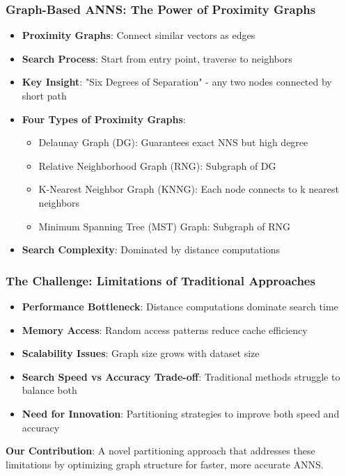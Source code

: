 \begin{frame}
\frametitle{Graph-Based ANNS: The Power of Proximity Graphs}

\begin{itemize}
    \item \textbf{Proximity Graphs}: Connect similar vectors as edges
    \item \textbf{Search Process}: Start from entry point, traverse to neighbors
    \item \textbf{Key Insight}: "Six Degrees of Separation" - any two nodes connected by short path
    \item \textbf{Four Types of Proximity Graphs}:
    \begin{itemize}
        \item Delaunay Graph (DG): Guarantees exact NNS but high degree
        \item Relative Neighborhood Graph (RNG): Subgraph of DG
        \item K-Nearest Neighbor Graph (KNNG): Each node connects to k nearest neighbors
        \item Minimum Spanning Tree (MST) Graph: Subgraph of RNG
    \end{itemize}
    \item \textbf{Search Complexity}: Dominated by distance computations
\end{itemize}
\end{frame}%
\begin{frame}
\frametitle{The Challenge: Limitations of Traditional Approaches}

\begin{itemize}
    \item \textbf{Performance Bottleneck}: Distance computations dominate search time
    \item \textbf{Memory Access}: Random access patterns reduce cache efficiency
    \item \textbf{Scalability Issues}: Graph size grows with dataset size
    \item \textbf{Search Speed vs Accuracy Trade-off}: Traditional methods struggle to balance both
    \item \textbf{Need for Innovation}: Partitioning strategies to improve both speed and accuracy
\end{itemize}

\vspace{0.5cm}
\textbf{Our Contribution}: A novel partitioning approach that addresses these limitations by optimizing graph structure for faster, more accurate ANNS.
\end{frame}%

